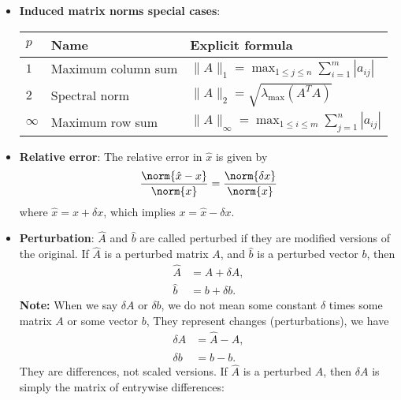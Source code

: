 \documentclass{report}
\begin{document}
\begin{itemize}
        \item \textbf{Induced matrix norms special cases}:
            \begin{center}
                \begin{tabular}{p{1cm}|p{5cm}|p{5cm}}
                    \toprule
                    $p$ & \textbf{Name} & \textbf{Explicit formula} \\
                    \midrule
                    $1$ & Maximum column sum &
                    $\displaystyle \|A\|_{1} = \max_{1 \leq j \leq n} \sum_{i=1}^{m} |a_{ij}|$ \\[3ex]
                    $2$ & Spectral norm &
                    $\displaystyle \|A\|_{2} = \sqrt{\lambda_{\max}(A^{T}A)}$ \\[3ex]
                    $\infty$ & Maximum row sum &
                    $\displaystyle \|A\|_{\infty} = \max_{1 \leq i \leq m} \sum_{j=1}^{n} |a_{ij}|$ \\
                    \bottomrule
                \end{tabular}
            \end{center}
        \item \textbf{Relative error}: The relative error in $\hat{x}$ is given by
            \begin{align*}
                \frac{\norm{\hat{x} - x}}{\norm{x}} = \frac{\norm{\delta x}}{\norm{x}}
            \end{align*}
            where $\hat{x} = x + \delta  x $, which implies $x = \hat{x} - \delta  x $.
        \item \textbf{Perturbation}: $\hat{A}$ and $\hat{b}$ are called perturbed if they are modified versions of the original. If $\hat{A}$ is a perturbed matrix $A$, and $\hat{b}$ is a perturbed vector $b$, then
            \begin{align*}
                \hat{A} &= A + \delta A, \\
                \hat{b} &= b + \delta  b
            .\end{align*}
            \textbf{Note:} When we say $\delta A$ or $\delta  b$, we do not mean some constant $\delta$ times some matrix $A$ or some vector $b$, They represent changes (perturbations), we have
            \begin{align*}
                \delta A &= \hat{A} - A, \\
                \delta b &= \hat{b} - b
            .\end{align*}
            They are differences, not scaled versions. If $\hat{A}$ is a perturbed $A$, then $\delta A$ is simply the matrix of entrywise differences:

\end{itemize}
\end{document}
